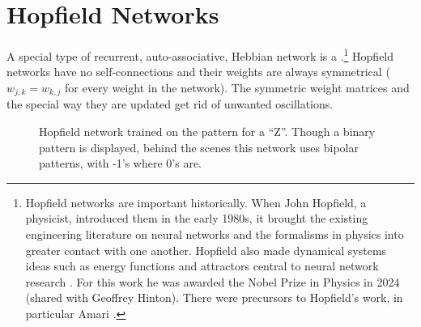

\section{Hopfield Networks}


A special type of recurrent, auto-associative, Hebbian network is a .\footnote{Hopfield networks are important historically. When John Hopfield, a physicist, introduced them in the early 1980s, it brought the existing engineering literature on neural networks and the formalisms in physics into greater contact with one another. Hopfield also made dynamical systems ideas such as energy functions and attractors central to neural network research \cite{hopfield1982neural}. For this work he was awarded the Nobel Prize in Physics in 2024 (shared with Geoffrey Hinton). There were precursors to Hopfield's work, in particular Amari \cite{amari1972learning}.}  Hopfield networks have no self-connections and their weights are always symmetrical ($w_{j,k} = w_{k,j}$ for every weight in the network). The symmetric weight matrices and the special way they are updated get rid of unwanted oscillations.

\begin{figure}[h]
\centering
{}
\caption[Simbrain screenshot]{Hopfield network trained on the pattern for a ``Z''. Though a binary pattern is displayed, behind the scenes this network uses bipolar patterns, with -1's where 0's are.}
\label{F:hopfield}
\end{figure}


